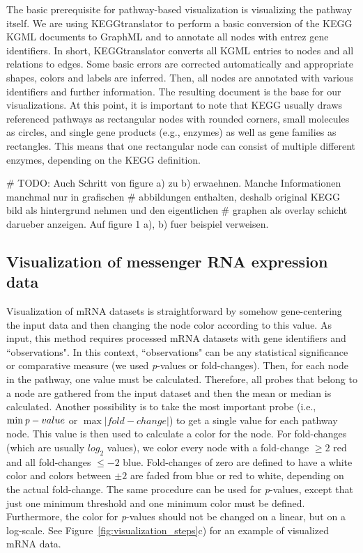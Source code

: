 \documentclass{bioinfo}
\begin{document}
The basic prerequisite for pathway-based visualization is visualizing the pathway itself. We are
using KEGGtranslator \citep[see][]{Wrzodek2011} to perform a basic conversion of the KEGG KGML
documents to GraphML and to annotate all nodes with entrez gene identifiers. In short,
KEGGtranslator converts all KGML entries to nodes and all relations to edges. Some basic errors are
corrected automatically and appropriate shapes, colors and labels are inferred. Then, all nodes are
annotated with various identifiers and further information. The resulting document is the base for
our visualizations. At this point, it is important to note that KEGG usually draws referenced
pathways as rectangular nodes with rounded corners, small molecules as circles, and single gene
products (e.g., enzymes) as well as gene families as rectangles. This means that one rectangular
node can consist of multiple different enzymes, depending on the KEGG definition.

# TODO: Auch Schritt von figure a) zu b) erwaehnen. Manche Informationen manchmal nur in grafischen
# abbildungen enthalten, deshalb original KEGG bild als hintergrund nehmen und den eigentlichen
# graphen als overlay schicht darueber anzeigen. Auf figure 1 a), b) fuer beispiel verweisen.

\subsection{Visualization of messenger RNA expression data} 

Visualization of mRNA datasets is straightforward by somehow gene-centering the input data and then
changing the node color according to this value. As input, this method requires processed mRNA
datasets with gene identifiers and ``observations". In this context, ``observations" can be any
statistical significance or comparative measure (we used \emph{p}-values or fold-changes). Then, for
each node in the pathway, one value must be calculated. Therefore, all probes that belong to a node
are gathered from the input dataset and then the mean or median is calculated. Another possibility
is to take the most important probe (i.e., $\min\emph{p}-value$ or $\max|fold-change|$) to get a
single value for each pathway node.  This value is then used to calculate a color for the node. For
fold-changes (which are usually $log_2$ values), we color every node with a fold-change $\geq2$ red
and all fold-changes $\leq-2$ blue. Fold-changes of zero are defined to have a white color and
colors between $\pm2$ are faded from blue or red to white, depending on the actual fold-change. The
same procedure can be used for \emph{p}-values, except that just one minimum threshold and one
minimum color must be defined. Furthermore, the color for \emph{p}-values should not be changed on a
linear, but on a log-scale. See Figure~\ref{fig:visualization_steps}c) for an example of visualized
mRNA data.
\end{document}
